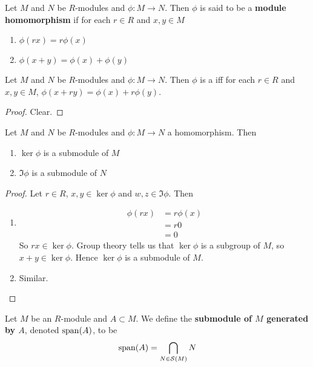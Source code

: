 \documentclass{book}
\begin{document}
	\begin{defn}
	Let $M$ and $N$ be $R$-modules and $\phi:M \rightarrow N$. Then $\phi$ is said to be a \textbf{module homomorphism} if for each $r \in R$ and $x,y \in M$
	\begin{enumerate}
	\item $\phi(rx) = r\phi(x)$
	\item $\phi(x+y) = \phi(x) + \phi(y)$
	\end{enumerate}
	\end{defn}	
	
	\begin{ex}
	Let $M$ and $N$ be $R$-modules and $\phi:M \rightarrow N$. Then $\phi$ is a  iff for each $r \in R$ and $x,y \in M$, $\phi(x+ry) = \phi(x) + r \phi(y)$.
	\end{ex}
	
	\begin{proof}
	Clear.
	\end{proof}
	
	\begin{ex}
	Let $M$ and $N$ be $R$-modules and $\phi:M \rightarrow N$ a homomorphism. Then 
	\begin{enumerate}
	\item $\ker \phi$ is a submodule of $M$
	\item $ \Im \phi$ is a submodule of $N$ 
	\end{enumerate}
	\end{ex}
	
	\begin{proof}
	Let $r \in R$, $x,y \in \ker \phi$ and $w,z \in \Im \phi$. Then 
	\begin{enumerate}
	\item 
	\begin{align*}
	\phi(rx) 
	&= r\phi(x) \\
	&=r 0 \\
	&= 0
\end{align*}	
	So $rx \in \ker \phi$. Group theory tells us that $\ker \phi$ is a subgroup of $M$, so $x+y \in \ker \phi$. Hence $\ker \phi$ is a submodule of $M$. 
	\item Similar.
	\end{enumerate}
	\end{proof}
	
	\begin{defn}
	Let $M$ be an $R$-module and $A \subset M$. We define the \textbf{submodule of $M$ generated by $A$}, denoted $\operatorname{span}(A)$, to be $$\operatorname{span}(A) = \bigcap_{N \in \mathcal{S}(M)} N$$ 
	\end{defn}
	
\end{document}
